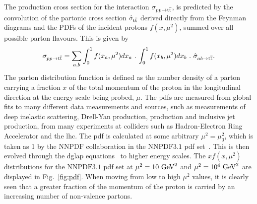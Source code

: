 The production cross section for the interaction $\sigma_{pp\to\mathrm{t}\overline{\mathrm{t}}{}}$, is predicted by the convolution of the partonic cross section $\hat{\sigma}_{\mathrm{t}\overline{\mathrm{t}}{}}$ derived directly from the Feynman diagrams and the PDFs of the incident protons $f(x, \mu^{2})$, summed over all possible parton flavours.
This is given by
\begin{equation}
\label{eq:pdf}
	\sigma_{pp\to\mathrm{t}\overline{\mathrm{t}}{}} = \sum_{a, b}\int_{0}^{1}f(x_{a}, \mu^{2})dx_{a}\,\,.\,\int_{0}^{1}f(x_{b}, \mu^{2})dx_{b}\,\,.\,\,\hat{\sigma}_{ab\to\mathrm{t}\overline{\mathrm{t}}{}}.
\end{equation}
The parton distribution function is defined as the number density of a parton carrying a fraction $x$ of the total momentum of the proton in the longitudinal direction at the energy scale being probed, $\mu$.
The \acrshort{pdf}s are measured from global fits to many different data measurements and sources, such as measurements of deep inelastic scattering, Drell-Yan production, \ttbar{} production and inclusive jet production, from many experiments at colliders such as Hadron-Electron Ring Accelerator and the \acrshort{lhc}.
The \acrshort{pdf} is calculated at some arbitrary $\mu^{2} = \mu^{2}_{0}$, which is taken as 1\GeV{} by the $\mathrm{NNPDF}$ collaboration in the $\mathrm{NNPDF3.1}$ \acrshort{pdf} set~\cite{NNPDF3p1}.
This is then evolved through the \acrfull{dglap} equations~\cite{Th:D, Th:GL, Th:AP} to higher energy scales.
The $xf(x, \mu^{2})$ distributions for the $\mathrm{NNPDF3.1}$ \acrshort{pdf} set at $\mu^{2} = 10\mathrm{~Ge\hspace{-.08em}V}^{2}$ and $\mu^{2} = 10^{4}\mathrm{~Ge\hspace{-.08em}V}^{2}$ are displayed in Fig.~\ref{fig:pdf}.
When moving from low to high $\mu^{2}$ values, it is clearly seen that a greater fraction of the momentum of the proton is carried by an increasing number of non-valence partons.

